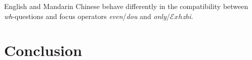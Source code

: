 \documentclass[12pt]{article}
\newcommand{\Exh}{\ensuremath{\mathcal{E}\mathit{xh}}}
\newcommand{\Pex}{\ensuremath{\mathcal{P}\mathit{ex}}}
\begin{document}
 English and Mandarin Chinese behave differently in the compatibility between \emph{wh}-questions and focus operators \emph{even}/\emph{dou} and \emph{only}/{\Exh}\emph{zhi}.
%

\section{Conclusion}
\label{sec:conclusion}
\end{document}
